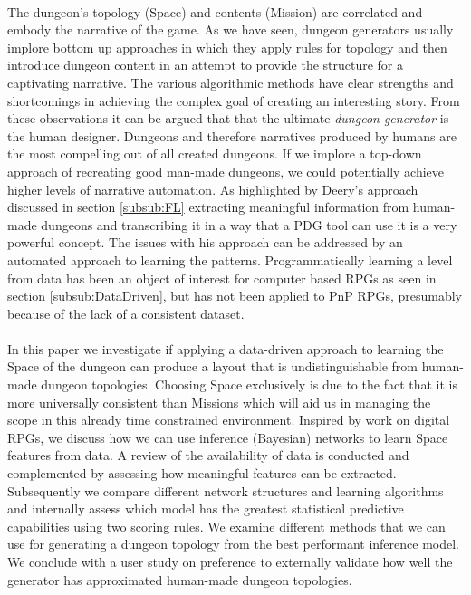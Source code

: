 \documentclass{UoYCSproject}
\begin{document}
\paragraph{}
The dungeon’s topology (Space) and contents (Mission) are correlated and embody the narrative of the game. As we have seen, dungeon generators usually implore bottom up approaches in which they apply rules for topology and then introduce dungeon content in an attempt to provide the structure for a captivating narrative. The various algorithmic methods have clear strengths and shortcomings in achieving the complex goal of creating an interesting story. From these observations it can be argued that that the ultimate \textit{dungeon generator} is the human designer. Dungeons and therefore narratives produced by humans are the most compelling out of all created dungeons. If we implore a top-down approach of recreating good man-made dungeons, we could potentially achieve higher levels of narrative automation. As highlighted by Deery's approach discussed in section \ref{subsub:FL} extracting meaningful information from human-made dungeons and transcribing it in a way that a PDG tool can use it is a very powerful concept. The issues with his approach can be addressed by an automated approach to learning the patterns. Programmatically learning a level from data has been an object of interest for computer based RPGs as seen in section \ref{subsub:DataDriven}, but has not been applied to PnP RPGs, presumably because of the lack of a consistent dataset.

\paragraph{}
In this paper we investigate if applying a data-driven approach to learning the Space of the dungeon can produce a layout that is undistinguishable from human-made dungeon topologies. Choosing Space exclusively is due to the fact that it is more universally consistent than Missions which will aid us in managing the scope in this already time constrained environment. Inspired by work on digital RPGs, we discuss how we can use inference (Bayesian) networks to learn Space features from data. A review of the availability of data is conducted and complemented by assessing how meaningful features can be extracted. Subsequently we compare different network structures and learning algorithms and internally assess which model has the greatest statistical predictive capabilities using two scoring rules. We examine different methods that we can use for generating a dungeon topology from the best performant inference model. We conclude with a user study on preference to externally validate how well the generator has approximated human-made dungeon topologies.
\end{document}
